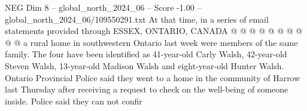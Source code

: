 \begin{textsample}{NEG Dim 8 – global\_north\_2024\_06 – Score -1.00 – global\_north\_2024\_06/109550291.txt}
At that time, in a series of email statements provided through ESSEX, ONTARIO, CANADA @ @ @ @ @ @ @ @ @ @ a rural home in southwestern Ontario last week were members of the same family.
The four have been identified as 41-year-old Carly Walsh, 42-year-old Steven Walsh, 13-year-old Madison Walsh and eight-year-old Hunter Walsh.
Ontario Provincial Police said they went to a home in the community of Harrow last Thursday after receiving a request to check on the well-being of someone inside.
Police said they can not confir

\end{textsample}
